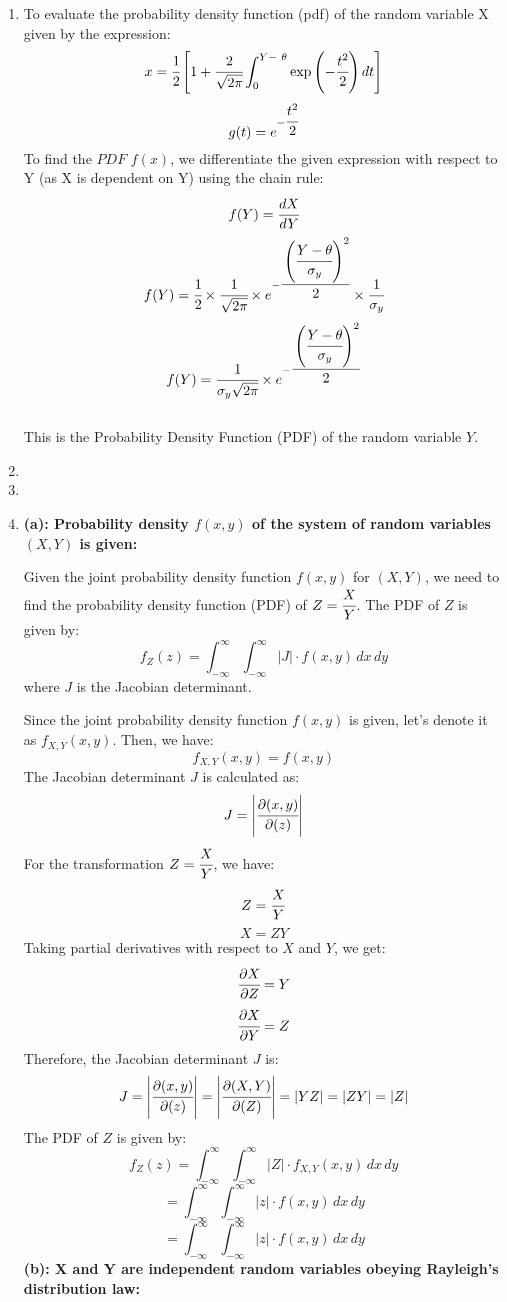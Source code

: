 \documentclass{article}
\begin{document}
\begin{enumerate}
\newpage
\item 
    To evaluate the probability density function (pdf) of the random variable X given by the expression:
    \[
        x = \cfrac{1}{2}\left[1 + \cfrac{2}{\sqrt{2\pi}}\int_{0}^{Y -\  \theta} \exp\left(-\cfrac{t^2}{2}\right) dt\right]
    \]
    \[
        g(t) = e^{-\cfrac{t^2}{2}}
    \]
    To find the \(PDF\) $f(x)$, we differentiate the given expression with respect to Y (as X is dependent on Y) using the chain rule:
    \[
        f(Y) = \cfrac{dX}{dY}
    \]
    \[
        f(Y) = \cfrac{1}{2}\times \cfrac{1}{\sqrt{2\pi}} \times e^{-\cfrac{\left(\cfrac{Y - \theta}{\sigma_y}\right)^2}{2}} \times \cfrac{1}{\sigma_y}
    \]
    \[
        f(Y) = \cfrac{1}{\sigma_y\sqrt{2\pi}} \times e^{-\cfrac{\left(\cfrac{Y - \theta}{\sigma_y}\right)^2}{2}}
    \]\\
    This is the Probability Density Function (PDF) of the random variable \(Y\).

\newpage
\item

\newpage
\item

\newpage
\item
    \textbf{(a): Probability density \( f(x, y) \) of the system of random variables \( (X, Y) \) is given:}

    Given the joint probability density function \( f(x, y) \) for \( (X, Y) \), we need to find the probability density function (PDF) of \( Z = \cfrac{X}{Y} \).
    The PDF of \( Z \) is given by:
    \[ 
        f_Z(z) = \int_{-\infty}^{\infty} \int_{-\infty}^{\infty} |J| \cdot f(x, y) \,dx \,dy 
    \]
    where \( J \) is the Jacobian determinant.

    Since the joint probability density function \( f(x, y) \) is given, let's denote it as \( f_{X,Y}(x, y) \). Then, we have:
    \[ 
        f_{X,Y}(x, y) = f(x, y) 
    \]
    The Jacobian determinant \( J \) is calculated as:
    \[ 
        J = \left| \cfrac{\partial(x, y)}{\partial(z)} \right| 
    \]
    For the transformation \( Z = \cfrac{X}{Y} \), we have:
    \[ Z = \cfrac{X}{Y} \]
    \[ X = ZY \]
    Taking partial derivatives with respect to \( X \) and \( Y \), we get:
    \[ 
        \cfrac{\partial X}{\partial Z} = Y 
    \]
    \[ 
        \cfrac{\partial X}{\partial Y} = Z 
    \]
    Therefore, the Jacobian determinant \( J \) is:
    \[ 
        J = \left| \cfrac{\partial(x, y)}{\partial(z)} \right| = \left| \cfrac{\partial(X, Y)}{\partial(Z)} \right| = |YZ| = |ZY| = |Z| 
    \]
    The PDF of \( Z \) is given by:
    \[
        f_Z(z) = \int_{-\infty}^{\infty} \int_{-\infty}^{\infty} |Z| \cdot f_{X,Y}(x, y) \,dx \,dy
    \]
    \[
         = \int_{-\infty}^{\infty} \int_{-\infty}^{\infty} |z| \cdot f(x, y) \,dx \,dy
    \]
    \[ 
        = \int_{-\infty}^{\infty} \int_{-\infty}^{\infty} |z| \cdot f(x, y) \,dx \,dy 
    \]
    \newpage
    \textbf{(b): X and Y are independent random variables obeying Rayleigh’s distribution law:}


\end{enumerate}
\end{document}
